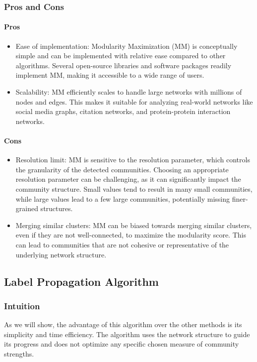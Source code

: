 \documentclass{article}
\begin{document}
\subsubsection{Pros and Cons}
\paragraph{Pros}
\begin{itemize}
    \item Ease of implementation: Modularity Maximization (MM) is conceptually simple and can be implemented with relative ease compared to other algorithms. Several open-source libraries and software packages readily implement MM, making it accessible to a wide range of users.
    \item Scalability: MM efficiently scales to handle large networks with millions of nodes and edges. This makes it suitable for analyzing real-world networks like social media graphs, citation networks, and protein-protein interaction networks.
\end{itemize}
\paragraph{Cons}
\begin{itemize}
    \item Resolution limit: MM is sensitive to the resolution parameter, which controls the granularity of the detected communities. Choosing an appropriate resolution parameter can be challenging, as it can significantly impact the community structure. Small values tend to result in many small communities, while large values lead to a few large communities, potentially missing finer-grained structures.
    \item Merging similar clusters: MM can be biased towards merging similar clusters, even if they are not well-connected, to maximize the modularity score. This can lead to communities that are not cohesive or representative of the underlying network structure.
\end{itemize}

\subsection{Label Propagation Algorithm}
\subsubsection{Intuition}
As we will show, the advantage of this algorithm over the other methods is its simplicity and time efficiency. The algorithm uses the network structure to guide its progress and does not optimize any specific chosen measure of community strengths.
\end{document}
